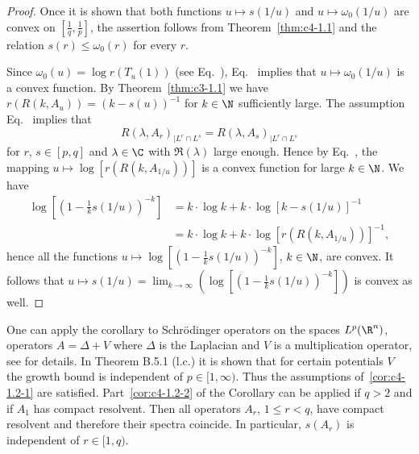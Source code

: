 \begin{proof}
Once it is shown that both functions $u \mapsto s(1/u)$ and $u \mapsto \omega_{0}(1/u)$ are convex on $[\frac{1}{q},\frac{1}{p}]$, the assertion follows from  Theorem~\ref{thm:c4-1.1} and the relation $s(r) \leq \omega_{0}(r)$ for every $r$.

Since $\omega_{0}(u) = \log r(T_{u}(1))$ (see Eq.~), Eq.~ implies that $u \mapsto \omega_0(1/u)$ is a convex function.
By Theorem~\ref{thm:c3-1.1} we have $r(R(k,A_{u})) = (k-s(u))^{-1}$ for $k \in \N$ sufficiently large.
The assumption Eq.~ implies that 
\[
R(\lambda,A_{r})_{|L^{r} \cap L^{s}} = R(\lambda,A_{s})_{|L^{r} \cap L^{s}}
\]
for $r$, $s \in [p,q]$ and $\lambda \in \C$ with $\Re(\lambda)$ large enough.
Hence by Eq.~, the mapping  $u \mapsto \log [r(R(k,A_{1/u}))]$ is a convex function for large $k \in \N$.
We have
\begin{align*}
\log  \left[(1 - \frac{1}{k}s(1/u))^{-k}\right] &= k \cdot \log k + k \cdot \log [k - s(1/u)]^{-1} \\
&= k \cdot \log k + k \cdot \log [r(R(k,A_{1/u}))]^{-1},
\end{align*}
hence all the functions $u \mapsto \log[(1 - \frac{1}{k}s(1/u))^{-k}]$, $k \in \N$, are convex.
It follows that $u \mapsto s(1/u) = \lim_{k\to\infty}(\log [(1 - \frac{1}{k}s(1/u))^{-k}])$ is convex as well.
\end{proof}
One can apply the corollary to Schrödinger operators on the spaces $L^{p}(\R^{n})$, \ie operators $A = \Delta + V$ where $\Delta$ is the Laplacian and $V$ is a multiplication operator, see  \textcite{simon:1982} for details.
In Theorem B.5.1 (l.c.) it is shown that for certain potentials $V$ the growth bound is independent of\/ $p \in [1,\infty)$.
Thus the assumptions of~\ref{cor:c4-1.2-1} are satisfied.
Part~\ref{cor:c4-1.2-2} of the Corollary can be applied if\/ $q > 2$ and if\/ $A_{1}$ has compact resolvent.
Then all operators $A_{r}$, $1 \leq r < q$, have compact resolvent and therefore their spectra coincide.
In particular, $s(A_{r})$ is independent of\/ $r \in [1,q)$.

